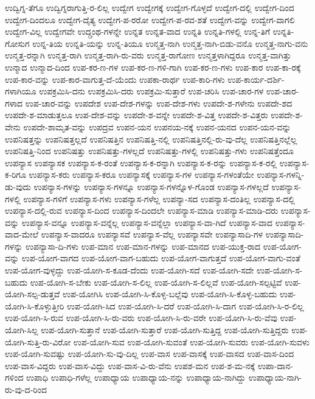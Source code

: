 {ಉದ್ವಿಗ್ನ-ತೆಗೂ
ಉದ್ವಿಗ್ನರಾಗುತ್ತಿ-ರ-ಲಿಲ್ಲ
ಉದ್ವೇಗ
ಉದ್ವೇಗಕ್ಕೆ
ಉದ್ವೇಗ-ಗೊಳ್ಳದೆ
ಉದ್ವೇಗ-ದಲ್ಲಿ
ಉದ್ವೇಗ-ದಿಂದ
ಉದ್ವೇಗ-ದಿಂದಲೂ
ಉದ್ವೇಗ-ದೈತ್ಯ
ಉದ್ವೇಗ-ಪ-ರರೋ
ಉದ್ವೇಗ-ಪ-ರವ-ಶತೆ
ಉದ್ವೇಗ-ವನ್ನು
ಉದ್ವೇಗ-ವಾಗಲಿ
ಉದ್ವೇಗ-ವಿಲ್ಲ
ಉದ್ವೇಗವೇ
ಉದ್ಗ್ರಂಥ-ಗಳನ್ನೇ
ಉನ್ನತ
ಉನ್ನತ-ವಾದ
ಉನ್ನತಿ
ಉನ್ನತಿ-ಗಳಲ್ಲಿ
ಉನ್ನ-ತಿಗೆ
ಉನ್ನತಿ-ಗೋಸುಗ
ಉನ್ನ-ತಿಯ
ಉನ್ನತಿ-ಯನ್ನು
ಉನ್ನ-ತಿಯೂ
ಉನ್ಮತ್ತ-ನಾಗಿ
ಉನ್ಮತ್ತ-ನಾಗಿ-ಬಿಡು-ವನೊ
ಉನ್ಮತ್ತ-ನಾಗು-ವನು
ಉನ್ಮತ್ತ-ರನ್ನಾಗಿ
ಉನ್ಮತ್ತ-ರಾಗಿ
ಉನ್ಮತ್ತ-ರಾಗಿ-ರು-ವರು
ಉನ್ಮತ್ತ-ರಾಗೋಣ
ಉನ್ಮತ್ತಳಾಗಿದ್ದರೂ
ಉನ್ಮತ್ತ-ವಾಗಿತ್ತು
ಉನ್ಮಾದ
ಉನ್ಮಾದ-ದಿಂದ
ಉಪ-ಕರ-ಣ-ಗಳ
ಉಪ-ಕರ-ಣ-ಗಳಿ-ಗಾಗಿ
ಉಪ-ಕರ-ಣ-ಗಳು
ಉಪ-ಕಾರ
ಉಪ-ಕಾ-ರಕ್ಕೆ
ಉಪ-ಕಾರ-ವನ್ನು
ಉಪ-ಕಾರ-ವಾಗುತ್ತ-ದೆ-ಯೆಂದು
ಉಪಕಾ-ರಾರ್ಥ
ಉಪ-ಕಾರಿ-ಗಳು
ಉಪ-ಕಾರ್ಯ-ದರ್ಶಿ-ಗಳಾಗಿಯೂ
ಉಪಕ್ರಮಿಸಿ-ದನು
ಉಪಕ್ರಮಿಸಿ-ದರು
ಉಪಕ್ರಮಿ-ಸುತ್ತಾರೆ
ಉಪ-ಚರಿಸಿ
ಉಪ-ಚಾರ-ಗಳ
ಉಪ-ಚಾರ-ಗಳಾದ
ಉಪ-ಚಾರ-ವನ್ನು
ಉಪದೇಶ
ಉಪ-ದೇಶ-ಗಳನ್ನು
ಉಪ-ದೇಶ-ಗಳು
ಉಪದೇ-ಶ-ಗಳೇನು
ಉಪದೇ-ಶದ
ಉಪದೇ-ಶ-ಮಾಡುತ್ತಲೂ
ಉಪ-ದೇಶ-ವನ್ನು
ಉಪದೇ-ಶ-ವನ್ನೇ
ಉಪದೇ-ಶ-ವಿತ್ತ
ಉಪದೇ-ಶ-ವಿತ್ತರು
ಉಪದೇ-ಶ-ವೇನು
ಉಪದೇ-ಶಾಮೃತ-ವನ್ನು
ಉಪದ್ರವ
ಉಪನ-ಯನ
ಉಪನಯ-ನಕ್ಕೆ
ಉಪನ-ಯನದ
ಉಪನ-ಯನ-ವನ್ನು
ಉಪನಿಷತ್ತನ್ನು
ಉಪನಿಷತ್ತಲ್ಲದೆ
ಉಪನಿಷತ್ತಿನ
ಉಪನಿಷತ್ತಿ-ನಲ್ಲಿ
ಉಪನಿಷತ್ತಿನಲ್ಲಿ-ರು-ವು-ದೆಲ್ಲ
ಉಪನಿಷತ್ತಿನಲ್ಲೆಲ್ಲ
ಉಪನಿಷತ್ತಿ-ನಿಂದ
ಉಪನಿಷತ್ತು
ಉಪನಿಷತ್ತು-ಗಳಲ್ಲದೆ
ಉಪನಿಷತ್ತು-ಗಳಲ್ಲಿ
ಉಪನಿಷತ್ತು-ಗಳು
ಉಪನಿಷತ್ತೆಂದೂ
ಉಪನ್ಯಾಸ
ಉಪನ್ಯಾಸಕ
ಉಪನ್ಯಾಸ-ಕ-ರಂತೆ
ಉಪನ್ಯಾಸ-ಕ-ರನ್ನಾಗಿ
ಉಪನ್ಯಾಸ-ಕ-ರನ್ನು
ಉಪನ್ಯಾಸ-ಕ-ರಲ್ಲಿ
ಉಪನ್ಯಾಸ-ಕ-ರಿಗೂ
ಉಪನ್ಯಾಸ-ಕರು
ಉಪನ್ಯಾಸ-ಕರೂ
ಉಪನ್ಯಾಸಕ್ಕೆ
ಉಪನ್ಯಾಸ-ಗಳ
ಉಪನ್ಯಾಸ-ಗಳಂತೆಯೇ
ಉಪನ್ಯಾಸ-ಗಳನ್ನಿ-ಡು-ವುದು
ಉಪನ್ಯಾಸ-ಗಳನ್ನು
ಉಪನ್ಯಾಸ-ಗಳನ್ನೂ
ಉಪನ್ಯಾಸ-ಗಳನ್ನೊಳ-ಗೊಂಡ
ಉಪನ್ಯಾಸ-ಗಳಲ್ಲದೆ
ಉಪನ್ಯಾಸ-ಗಳಲ್ಲಿ
ಉಪನ್ಯಾಸ-ಗಳಿಗೆ
ಉಪನ್ಯಾಸ-ಗಳು
ಉಪನ್ಯಾಸ-ಗಳೆಲ್ಲ
ಉಪನ್ಯಾ-ಸದ
ಉಪನ್ಯಾಸ-ದಂತಿಲ್ಲ
ಉಪನ್ಯಾಸ-ದಲ್ಲಿ
ಉಪನ್ಯಾಸ-ದಲ್ಲಿ-ರುವ
ಉಪನ್ಯಾಸ-ದಿಂದ
ಉಪನ್ಯಾಸ-ದಿಂದಲೇ
ಉಪನ್ಯಾಸ-ಮಾಡಿ
ಉಪನ್ಯಾಸ-ಮಾಡಿ-ದರು
ಉಪನ್ಯಾಸ-ವನ್ನು
ಉಪನ್ಯಾಸ-ವನ್ನೂ
ಉಪನ್ಯಾಸ-ವನ್ನೆಲ್ಲ
ಉಪನ್ಯಾಸ-ವನ್ನೆಲ್ಲಾ
ಉಪನ್ಯಾಸ-ವಾ-ಗಿದೆ
ಉಪನ್ಯಾಸ-ವಾದ
ಉಪನ್ಯಾಸ-ವಾದ-ಮೇಲೆ
ಉಪನ್ಯಾಸ-ವಾದರೂ
ಉಪನ್ಯಾಸವೆ
ಉಪನ್ಯಾಸ-ವೆಲ್ಲ
ಉಪನ್ಯಾಸವೇ
ಉಪನ್ಯಾಸಾದಿ-ಗಳ
ಉಪನ್ಯಾಸಾದಿ-ಗಳನ್ನು
ಉಪನ್ಯಾಸಾ-ದಿ-ಗಳು
ಉಪ-ಮಾನ
ಉಪ-ಮಾನ-ಗಳನ್ನು
ಉಪ-ಮಾನದ
ಉಪ-ಯುಕ್ತ-ರಾದ
ಉಪ-ಯೋಗ-ವನ್ನು
ಉಪ-ಯೋಗ-ವಾಗದ
ಉಪ-ಯೋಗ-ವಾಗ-ಬಹುದು
ಉಪ-ಯೋಗ-ವಾಗುತ್ತದೆ
ಉಪ-ಯೋಗ-ವಾಗು-ವಂತೆ
ಉಪ-ಯೋಗ-ವುಳ್ಳದ್ದು
ಉಪ-ಯೋಗಿ-ಸ-ಕೂಡ-ದೆಂದು
ಉಪ-ಯೋಗಿ-ಸದೆ
ಉಪ-ಯೋಗಿ-ಸದೇ
ಉಪ-ಯೋಗಿ-ಸ-ಬಹುದು
ಉಪ-ಯೋಗಿ-ಸ-ಬೇಕು
ಉಪ-ಯೋಗಿ-ಸ-ಲಿಲ್ಲ
ಉಪ-ಯೋಗಿ-ಸ-ಲಿಲ್ಲವೆ
ಉಪ-ಯೋಗಿ-ಸಲ್ಪಟ್ಟಿವೆ
ಉಪ-ಯೋಗಿ-ಸಲ್ಪ-ಡುತ್ತವೆ
ಉಪ-ಯೋಗಿಸಿ
ಉಪ-ಯೋಗಿ-ಸಿ-ಕೊಳ್ಳ-ಬಲ್ಲೆವು
ಉಪ-ಯೋಗಿ-ಸಿ-ಕೊಳ್ಳ-ಬಹುದು
ಉಪ-ಯೋಗಿ-ಸಿ-ಕೊಳ್ಳುತ್ತೀರಿ
ಉಪ-ಯೋಗಿ-ಸಿದ
ಉಪ-ಯೋಗಿ-ಸಿ-ದರೆ
ಉಪ-ಯೋಗಿ-ಸಿ-ದಾಗ
ಉಪ-ಯೋಗಿ-ಸಿ-ರ-ಲಿಲ್ಲ
ಉಪ-ಯೋಗಿ-ಸಿ-ರುವ
ಉಪ-ಯೋಗಿ-ಸಿ-ರು-ವರು
ಉಪ-ಯೋಗಿ-ಸಿ-ರು-ವರೇ
ಉಪ-ಯೋಗಿ-ಸಿ-ರು-ವೆವು
ಉಪ-ಯೋಗಿ-ಸಿಲ್ಲ
ಉಪ-ಯೋಗಿ-ಸುತ್ತಾನೆ
ಉಪ-ಯೋಗಿ-ಸುತ್ತಾರೆ
ಉಪ-ಯೋಗಿ-ಸುತ್ತಿದ್ದ
ಉಪ-ಯೋಗಿ-ಸುತ್ತಿದ್ದರು
ಉಪ-ಯೋಗಿ-ಸುತ್ತಿ-ರು-ವಿರೋ
ಉಪ-ಯೋಗಿ-ಸುವ
ಉಪ-ಯೋಗಿ-ಸುವಂತೆ
ಉಪ-ಯೋಗಿ-ಸುವರು
ಉಪ-ಯೋಗಿ-ಸುವಳು
ಉಪ-ಯೋಗಿ-ಸುವಷ್ಟು
ಉಪ-ಯೋಗಿ-ಸು-ವು-ದಿಲ್ಲ
ಉಪ-ವಾಸ
ಉಪ-ವಾಸಕ್ಕೆ
ಉಪ-ವಾಸದ
ಉಪ-ವಾಸ-ದಿಂದ
ಉಪ-ವಾಸ-ವಿದ್ದರು
ಉಪ-ವಾಸ-ವಿದ್ದು
ಉಪ-ವಾಸ-ವಿ-ರು-ವೆನು
ಉಪಶ-ಮನ
ಉಪ-ಶ-ಮ-ನಕ್ಕೆ
ಉಪಾ-ದಾನ-ಗಳಿಂದ
ಉಪಾಧಿ
ಉಪಾಧಿ-ಗಳೆಲ್ಲ
ಉಪಾಧ್ಯಾಯ
ಉಪಾಧ್ಯಾಯ-ನನ್ನು
ಉಪಾಧ್ಯಾಯ-ನಾಗಿದ್ದು
ಉಪಾಧ್ಯಾಯ-ನಾಗಿ-ರು-ವು-ದ-ರಿಂದ
}
